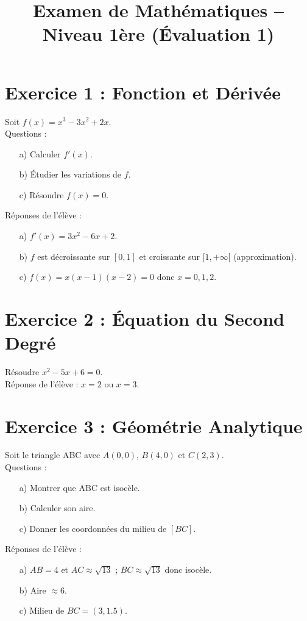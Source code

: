\documentclass{article}
\begin{document}
\title{Examen de Mathématiques – Niveau 1ère (Évaluation 1)}
\maketitle

\section*{Exercice 1 : Fonction et Dérivée}
Soit $f(x) = x^3 - 3x^2 + 2x$. \\
Questions :
\begin{enumerate}
    \item[a)] Calculer $f'(x)$.
    \item[b)] Étudier les variations de $f$.
    \item[c)] Résoudre $f(x) = 0$.
\end{enumerate}
Réponses de l’élève :
\begin{enumerate}
    \item[a)] $f'(x) = 3x^2 - 6x + 2$.
    \item[b)] $f$ est décroissante sur $[0,1]$ et croissante sur $[1,+\infty[$ (approximation).
    \item[c)] $f(x) = x(x-1)(x-2) = 0$ donc $x = 0, 1, 2$.
\end{enumerate}

\section*{Exercice 2 : Équation du Second Degré}
Résoudre $x^2 - 5x + 6 = 0$. \\ 
Réponse de l’élève : 
$x = 2$ ou $x = 3$.

\section*{Exercice 3 : Géométrie Analytique}
Soit le triangle ABC avec $A(0,0)$, $B(4,0)$ et $C(2,3)$. \\
Questions :
\begin{enumerate}
    \item[a)] Montrer que ABC est isocèle.
    \item[b)] Calculer son aire.
    \item[c)] Donner les coordonnées du milieu de $[BC]$.
\end{enumerate}
Réponses de l’élève :
\begin{enumerate}
    \item[a)] $AB = 4$ et $AC \approx \sqrt{13}$ ; $BC \approx \sqrt{13}$ donc isocèle.
    \item[b)] Aire $\approx 6$.
    \item[c)] Milieu de $BC = (3, 1.5)$.
\end{enumerate}
\end{document}
